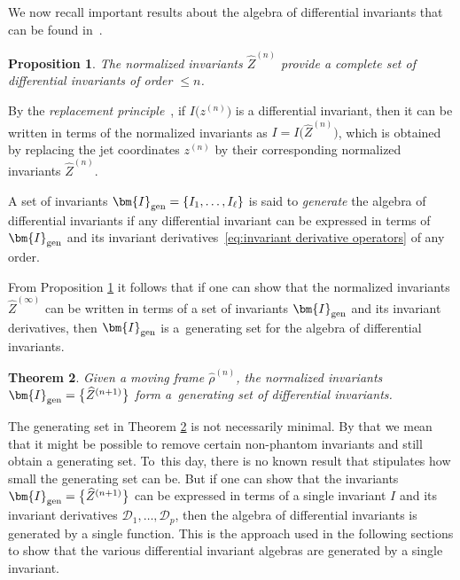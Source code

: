 \documentclass[pdftex]{sigma}%
\numberwithin{equation}{section}
\newtheorem{Theorem}{Theorem}[section]
\newtheorem{Proposition}[Theorem]{Proposition}
 { \theoremstyle{definition}
\newtheorem{Definition}[Theorem]{Definition}
\newtheorem{Note}[Theorem]{Note}
\newtheorem{Example}[Theorem]{Example}
\newtheorem{Remark}[Theorem]{Remark} }
\newcommand{\D}{\mathcal{D}}
\newcommand{\n}{^{(n)}}
\begin{document}
We now recall important results about the algebra of differential invariants that can be found in~\cite{FO-1999,O-2007}.

\begin{Proposition}\label{prop:complete set}
The normalized invariants $\widehat{Z}\n$ provide a complete set of differential invariants of order $\leq n$.
\end{Proposition}

By the \emph{replacement principle}~\cite{FO-1999,M-2010}, if $I\big(z\n\big)$ is a differential invariant, then it can be written in terms of the normalized invariants as $I=I\big(\widehat{Z}\n\big)$, which is obtained by replacing the jet coordinates $z\n$ by their corresponding normalized invariants $\widehat{Z}\n$.

\begin{Definition}
A set of invariants $\bm{I}_{{\rm gen}}=\{I_1,\dots,I_\ell\}$ is said to \emph{generate} the algebra of dif\-fe\-ren\-tial invariants if any differential invariant can be expressed in terms of $\bm{I}_{{\rm gen}}$ and its invariant derivatives~\eqref{eq:invariant derivative operators} of any order.
\end{Definition}

From Proposition \ref{prop:complete set} it follows that if one can show that the normalized invariants $\widehat{Z}^{(\infty)}$ can be written in terms of a set of invariants $\bm{I}_{{\rm gen}}$ and its invariant derivatives, then $\bm{I}_{{\rm gen}}$ is a~generating set for the algebra of differential invariants.

\begin{Theorem}\label{thm:generating set}
Given a moving frame $\widehat{\rho}\n$, the normalized invariants $\bm{I}_{{\rm gen}} = \big\{\widehat{Z}^{(n+1)}\big\}$ form a~generating set of differential invariants.
\end{Theorem}

The generating set in Theorem \ref{thm:generating set} is not necessarily minimal. By that we mean that it might be possible to remove certain non-phantom invariants and still obtain a generating set. To~this day, there is no known result that stipulates how small the generating set can be. But if one can show that the invariants $\bm{I}_{{\rm gen}}=\big\{\widehat{Z}^{(n+1)}\big\}$ can be expressed in terms of a single invariant $I$ and its invariant derivatives $\D_1,\dots,\D_p$, then the algebra of differential invariants is generated by a single function. This is the approach used in the following sections to show that the various differential invariant algebras are generated by a single invariant.
\end{document}
